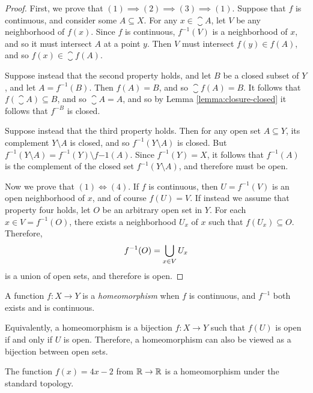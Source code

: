 \begin{proof}
    First, we prove that $(1) \implies (2) \implies (3) \implies (1)$. Suppose that $f$ is continuous, and consider some $A \subseteq X$. For any $x \in \closure{A}$, let $V$ be any neighborhood of $f(x)$. Since $f$ is continuous, $f^{-1}(V)$ is a neighborhood of $x$, and so it must intersect $A$ at a point $y$. Then $V$ must intersect $f(y) \in f(A)$, and so $f(x) \in \closure{f(A)}$.

    Suppose instead that the second property holds, and let $B$ be a closed subset of $Y$, and let $A = f^{-1}(B)$. Then $f(A) = B$, and so $\closure{f(A)} = B$. It follows that $f(\closure{A}) \subseteq B$, and so $\closure{A} = A$, and so by Lemma \ref{lemma:closure-closed} it follows that $f^{-B}$ is closed.

    Suppose instead that the third property holds. Then for any open set $A \subseteq Y$, its complement $Y \setminus A$ is closed, and so $f^{-1}(Y \setminus A)$ is closed. But $f^{-1}(Y \setminus A) = f^{-1}(Y) \setminus f{-1}(A)$. Since $f^{-1}(Y) = X$, it follows that $f^{-1}(A)$ is the complement of the closed set $f^{-1}(Y \setminus A)$, and therefore must be open.

    Now we prove that $(1) \iff (4)$. If $f$ is continuous, then $U = f^{-1}(V)$ is an open neighborhood of $x$, and of course $f(U) = V$. If instead we assume that property four holds, let $O$ be an arbitrary open set in $Y$. For each $x \in V = f^{-1}(O)$, there exists a neighborhood $U_x$ of $x$ such that $f(U_x) \subseteq O$. Therefore,
    \begin{align*}
        f^{-1}(O) = \bigcup_{x \in V}U_x
    \end{align*}
    is a union of open sets, and therefore is open.
\end{proof}

\begin{defn}
    A function $f: X \to Y$ is a \emph{homeomorphism} when $f$ is continuous, and $f^{-1}$ both exists and is continuous.
\end{defn}

\begin{rmk}
    Equivalently, a homeomorphism is a bijection $f: X \to Y$ such that $f(U)$ is open if and only if $U$ is open. Therefore, a homeomorphism can also be viewed as a bijection between open sets.
\end{rmk}

\begin{exmp}
    The function $f(x) = 4x - 2$ from $\mathbb{R} \to \mathbb{R}$ is a homeomorphism under the standard topology.
\end{exmp}

